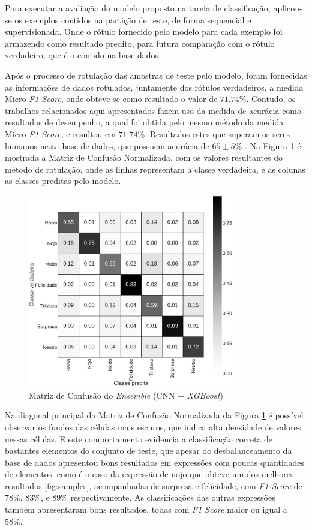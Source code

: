 Para executar a avaliação do modelo proposto na tarefa de classificação, aplicou-se os exemplos contidos na partição de teste, de forma sequencial e supervisionada. Onde o rótulo fornecido pelo modelo para cada exemplo foi armazendo como resultado predito, para futura comparação com o rótulo verdadeiro, que é o contido na base dados.

Após o processo de rotulação das amostras de teste pelo modelo, foram fornecidas as informações de dados rotulados, juntamente dos rótulos verdadeiros, a medida Micro \textit{F1 Score}, onde obteve-se como resultado o valor de $71.74$\%. Contudo, os trabalhos relacionados aqui apresentados fazem uso da medida de acurácia como resultados de desempenho, a qual foi obtida pelo mesmo método da medida Micro \textit{F1 Score}, e resultou em $71.74$\%. Resultados estes que superam os seres humanos nesta base de dados, que possuem acurácia de $65\pm5$\% \cite{goodfellow2013challenges}. Na Figura \ref{fig:emsemble} é mostrada a Matriz de Confusão Normalizada, com os valores resultantes do método de rotulação, onde as linhas representam a classe verdadeira, e as colunas as classes preditas pelo modelo.

\begin{figure}[!htb]
    \centering
    \includegraphics[width=9cm]{images/cm_emsemble.png}
    \caption{Matriz de Confusão do \emph{Ensemble} (CNN + \emph{XGBoost})}
    \label{fig:emsemble}
\end{figure}

Na diagonal principal da Matriz de Confusão Normalizada da Figura \ref{fig:emsemble} é possível observar os fundos das células mais escuros, que indica alta densidade de valores nessas células. E este comportamento evidencia a classificação correta de bastantes elementos do conjunto de teste, que apesar do desbalanceamento da base de dados apresentou bons resultados em expressões com poucas quantidades de elementos, como é o caso da expressão de nojo que obteve um dos melhores resultados \ref{fig:samples}, acompanhadas de surpresa e felicidade, com \textit{F1 Score} de 78\%, 83\%, e 89\% respectivamente. As classificações das outras expressões também apresentaram bons resultados, todas com \textit{F1 Score} maior ou igual a 58\%.

